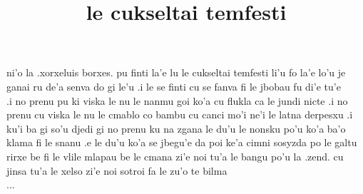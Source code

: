 \documentclass[ebook,oneside,onecolumn,openany,final]{memoir}
\begin{document}
\title{le cukseltai temfesti}

\clearpage
\frenchspacing
\large
ni'o la .xorxeluis borxes. pu finti la'e lu le cukseltai temfesti li'u fo la'e lo'u je ganai ru de'a senva do gi le'u .i le se finti cu se fanva fi le jbobau fu di'e tu'e \\

.i no prenu pu ki viska le nu le nanmu goi ko'a cu flukla ca le jundi nicte .i no prenu cu viska le nu le cmablo co bambu cu canci mo'i ne'i le latna derpesxu .i ku'i ba gi so'u djedi gi no prenu ku na zgana le du'u le nonsku po'u ko'a ba'o klama fi le snanu .e le du'u ko'a se jbegu'e da poi ke'a cimni sosyzda po le galtu rirxe be fi le vlile mlapau be le cmana zi'e noi tu'a le bangu po'u la .zend. cu jinsa tu'a le xelso zi'e noi sotroi fa le zu'o te bilma \\

...
\end{document}
